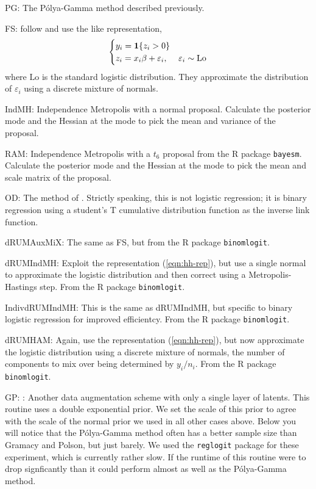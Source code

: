\documentclass{article}
\newcommand{\one}{\bold{1}}
\newcommand{\ep}{\varepsilon}
\newcommand{\Polya}{P\'{o}lya}
\begin{document}
\begin{outline}

\1 PG: The \Polya-Gamma method described previously.

\1 FS: \cite{fruhwirth-schnatter-fruhwirth-2010} follow \cite{holmes-held-2006}
and use the \cite{albert-chib-1993} like representation,
\begin{equation}
\label{eqn:hh-rep}
\begin{cases}
y_i = \one \{ z_i > 0 \} \\
z_i = x_i \beta + \ep_i, & \ep_i \sim \text{Lo}
\end{cases}
\end{equation}
where $\text{Lo}$ is the standard logistic distribution.  They approximate the
distribution of $\ep_i$ using a discrete mixture of normals.

\1 IndMH: Independence Metropolis with a normal proposal.  Calculate the
posterior mode and the Hessian at the mode to pick the mean and variance of the
proposal.

\1 RAM: Independence Metropolis with a $t_6$ proposal from the R package
\texttt{bayesm}.  Calculate the posterior mode and the Hessian at the mode to
pick the mean and scale matrix of the proposal.

\1 OD: The method of \cite{obrien-dunson-2004}.  Strictly speaking, this is not
logistic regression; it is binary regression using a student's T cumulative
distribution function as the inverse link function.

\1 dRUMAuxMiX: The same as FS, but from the R package \texttt{binomlogit}.

\1 dRUMIndMH: Exploit the representation (\ref{eqn:hh-rep}), but use a single
normal to approximate the logistic distribution and then correct using a
Metropolis-Hastings step.  From the R package \texttt{binomlogit}.

\1 IndivdRUMIndMH: This is the same as dRUMIndMH, but specific to binary
logistic regression for improved efficientcy.  From the R package
\texttt{binomlogit}.

\1 dRUMHAM: Again, use the representation (\ref{eqn:hh-rep}), but now
approximate the logistic distribution using a discrete mixture of normals, the
number of components to mix over being determined by $y_i / n_i$.  From the R
package \texttt{binomlogit}.

\1 GP: \cite{gramacy-polson-2012}: Another data augmentation scheme with only a
single layer of latents.  This routine uses a double exponential prior.  We set
the scale of this prior to agree with the scale of the normal prior we used in
all other cases above.  Below you will notice that the \Polya-Gamma method often
has a better sample size than Gramacy and Polson, but just barely.  We used the
\texttt{reglogit} package for these experiment, which is currently rather
slow.  If the runtime of this routine were to drop signficantly than it could
perform almost as well as the \Polya-Gamma method.

\end{outline}
\end{document}
